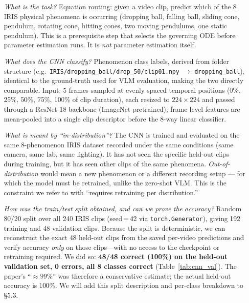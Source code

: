 \documentclass[10pt,twocolumn,letterpaper]{article}
\begin{document}
\noindent\textit{What is the task?} Equation routing: given a video clip, predict which of the 8 IRIS physical phenomena is occurring (dropping ball, falling ball, sliding cone, pendulum, rotating cone, hitting cones, two moving pendulums, one static pendulum). This is a prerequisite step that selects the governing ODE before parameter estimation runs. It is \emph{not} parameter estimation itself.

\noindent\textit{What does the CNN classify?} Phenomenon class labels, derived from folder structure (e.g.\ \texttt{IRIS/dropping\_ball/drop\_50/clip01.npy} $\to$ \texttt{dropping\_ball}), identical to the ground-truth used for VLM evaluation, making the two directly comparable. Input: 5 frames sampled at evenly spaced temporal positions (0\%, 25\%, 50\%, 75\%, 100\% of clip duration), each resized to $224{\times}224$ and passed through a ResNet-18 backbone (ImageNet-pretrained); frame-level features are mean-pooled into a single clip descriptor before the 8-way linear classifier.

\noindent\textit{What is meant by ``in-distribution''?} The CNN is trained and evaluated on the same 8-phenomenon IRIS dataset recorded under the same conditions (same camera, same lab, same lighting). It has not seen the specific held-out clips during training, but it has seen other clips of the same phenomena. \emph{Out-of-distribution} would mean a new phenomenon or a different recording setup — for which the model must be retrained, unlike the zero-shot VLM. This is the constraint we refer to with ``requires retraining per distribution.''

\noindent\textit{How was the train/test split obtained, and can we prove the accuracy?} Random 80/20 split over all 240 IRIS clips (seed\,=\,42 via \texttt{torch.Generator}), giving 192 training and 48 validation clips. Because the split is deterministic, we can reconstruct the exact 48 held-out clips from the saved per-video predictions and verify accuracy \emph{only} on those clips---with no access to the checkpoint or retraining required. We did so: \textbf{48/48 correct (100\%) on the held-out validation set, 0 errors, all 8 classes correct} (Table~\ref{tab:cnn_val}). The paper's ``${\approx}99\%$'' was therefore a conservative estimate; the actual held-out accuracy is 100\%. We will add this split description and per-class breakdown to \S5.3.
\end{document}
